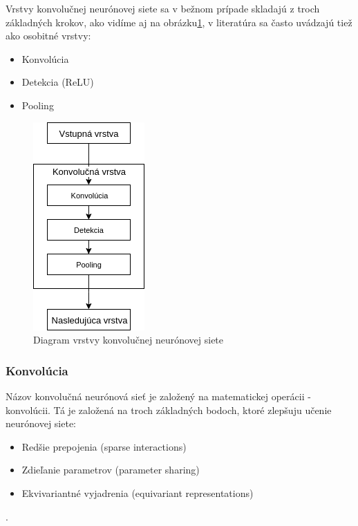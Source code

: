 Vrstvy konvolučnej neurónovej siete sa v bežnom prípade skladajú z troch základných krokov, ako vidíme aj na obrázku\ref{fig:convo}, v literatúra sa často uvádzajú tiež ako osobitné vrstvy:
\begin{itemize}
	\item Konvolúcia
	\item Detekcia (ReLU)
	\item Pooling
\end{itemize}


\begin{figure}[H]
	\centering
	\includegraphics[width=0.2\linewidth]{img/convo}
	\caption{Diagram vrstvy konvolučnej neurónovej siete}
	\label{fig:convo}
\end{figure}


\subsubsection{Konvolúcia}
Názov konvolučná neurónová sieť je založený na matematickej operácii - konvolúcii. 
Tá je založená na troch základných bodoch, ktoré zlepšuju učenie neurónovej siete:
\begin{itemize}
	\item Redšie prepojenia (sparse interactions)
	\item Zdieľanie parametrov (parameter sharing)
	\item Ekvivariantné vyjadrenia (equivariant representations)
\end{itemize}
\cite{goodfellow2016deep}.\\

